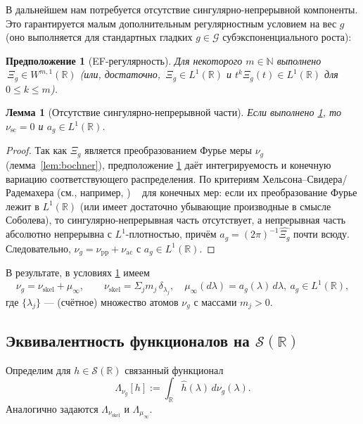 \documentclass{article}
\numberwithin{equation}{section}
\theoremstyle{plain}
\newtheorem{lemma}{Лемма}
\newtheorem{assumption}{Предположение}[section]
\theoremstyle{definition}
\theoremstyle{remark}
\def\delta{δ}\def\Delta{Δ}\def\epsilon{ε}\def\zeta{ζ}%
\def\infty{∞}\def\partial{∂}\def\sum{Σ}\def\int{∫}%
\begin{document}
В дальнейшем нам потребуется отсутствие сингулярно-непрерывной компоненты. Это гарантируется
малым дополнительным регулярностным условием на вес $g$ (оно выполняется для стандартных
гладких $g\in\mathcal G$ субэкспоненциального роста):

\begin{assumption}[EF-регулярность]
\label{as:EF_reg}
Для некоторого $m\in\mathbb N$ выполнено $\,\Xi_g\in W^{m,1}(\mathbb R)$
(или, достаточно, $\,\Xi_g\in L^1(\mathbb R)$ и $t^k\Xi_g(t)\in L^1(\mathbb R)$ для $0\le k\le m$).
\end{assumption}

\begin{lemma}[Отсутствие сингулярно-непрерывной части]
\label{lem:no_sc}
Если выполнено \ref{as:EF_reg}, то $\nu_{\mathrm{sc}}=0$ и $a_g\in L^1(\mathbb R)$.
\end{lemma}

\begin{proof}
Так как $\Xi_g$ является преобразованием Фурье меры $\nu_g$ (лемма~\ref{lem:bochner}),
предположение \ref{as:EF_reg} даёт интегрируемость и конечную вариацию соответствующего распределения.
По критериям Хельсона–Свидера/Радемахера (см., например, \cite[Ch.~IX]{Katznelson2004}) ~\cite{RudinHA} для конечных мер:
если их преобразование Фурье лежит в $L^1(\mathbb R)$ (или имеет достаточно убывающие производные
в смысле Соболева), то сингулярно-непрерывная часть отсутствует, а непрерывная часть абсолютно
непрерывна с $L^1$-плотностью, причём $a_g=(2\pi)^{-1}\widehat{\Xi_g}$ почти всюду. Следовательно,
$\nu_g=\nu_{\mathrm{pp}}+\nu_{\mathrm{ac}}$ с $a_g\in L^1(\mathbb R)$.
\end{proof}

В результате, в условиях \ref{as:EF_reg} имеем
\begin{equation}
\label{eq:nu_final_decomp}
\nu_g=\nu_{\mathrm{skel}}+\mu_\infty,\qquad
\nu_{\mathrm{skel}}=\sum_{j} m_j\,\delta_{\lambda_j},\quad
\mu_\infty(d\lambda)=a_g(\lambda)\,d\lambda,\ a_g\in L^1(\mathbb R),
\end{equation}
где $\{\lambda_j\}$ — (счётное) множество атомов $\nu_g$ с массами $m_j>0$.

\subsection{Эквивалентность функционалов на $\mathcal S(\mathbb R)$}
\label{subsec:functionals}

Определим для $h\in\mathcal S(\mathbb R)$ связанный функционал
\begin{equation}
\label{eq:Lambda_def}
\Lambda_{\nu_g}[h]:=\int_{\mathbb R}\widehat h(\lambda)\,d\nu_g(\lambda).
\end{equation}
Аналогично задаются $\Lambda_{\nu_{\mathrm{skel}}}$ и $\Lambda_{\mu_\infty}$.
\end{document}
